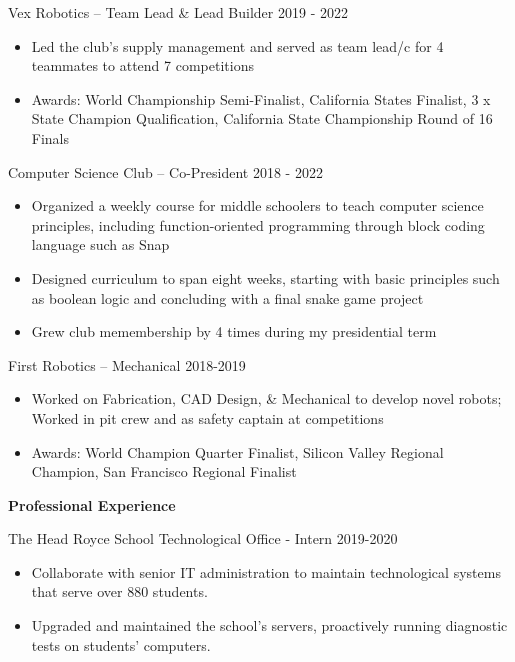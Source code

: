 \documentclass{article}
\begin{document}
\begin{spacing}{1.15}
\normalsize{
\noindent Vex Robotics – Team Lead \& Lead Builder \hfill 2019 - 2022
}
\small{
\begin{itemize}[noitemsep]
    \item Led the club’s supply management and served as team lead/c for 4 teammates to attend 7 competitions
    \item Awards: World Championship Semi-Finalist, California States Finalist, 3 x State Champion Qualification, California State Championship Round of 16 Finals  
\end{itemize}
\vspace*{0.15cm}
}

\normalsize{
\noindent Computer Science Club – Co-President \hfill 2018 - 2022
}
\small{
\begin{itemize}[noitemsep]
    \item Organized a weekly course for middle schoolers to teach computer science principles, including function-oriented programming through block coding language such as Snap
    \item Designed curriculum to span eight weeks, starting with basic principles such as boolean logic and concluding with a final snake game project
    \item Grew club memembership by 4 times during my presidential term
\end{itemize}
\vspace*{0.15cm}
}



\normalsize{
\noindent First Robotics – Mechanical \hfill 2018-2019  
}
\small{
\begin{itemize}[noitemsep]
    \item Worked on Fabrication, CAD Design, \& Mechanical to develop novel robots; Worked in pit crew and as safety captain at competitions
    \item Awards: World Champion Quarter Finalist,  Silicon Valley Regional Champion, San Francisco Regional Finalist
\end{itemize}
\vspace*{0.2cm}

}





\noindent\large{\bfseries Professional Experience \vspace*{0.2cm}}

\normalsize{
\noindent The Head Royce School Technological Office - Intern \hfill 2019-2020
}
\small{
\begin{itemize}[noitemsep]
    \item Collaborate with senior IT administration to maintain technological systems that serve over 880 students. 
    \item Upgraded and maintained the school's servers, proactively running diagnostic tests on students’ computers.
\end{itemize}
\vspace*{0.2cm}
}






\end{spacing}
\end{document}
